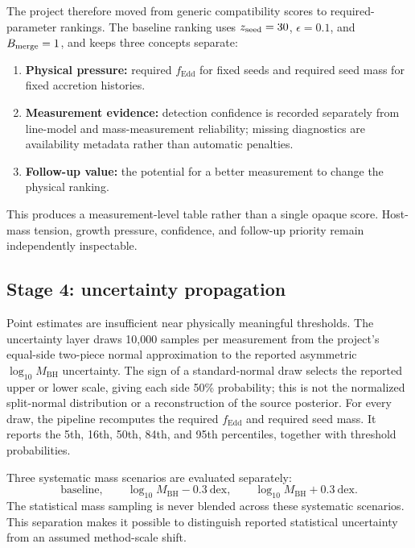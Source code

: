 \documentclass[11pt]{article}
\newcommand{\fedd}{f_{\mathrm{Edd}}}
\newcommand{\mbh}{M_{\mathrm{BH}}}
\begin{document}
The project therefore moved from generic compatibility scores to required-parameter rankings. The baseline ranking uses $z_{\rm seed}=30$, $\epsilon=0.1$, and $B_{\rm merge}=1$, and keeps three concepts separate:

\begin{enumerate}
  \item \textbf{Physical pressure:} required $\fedd$ for fixed seeds and required seed mass for fixed accretion histories.
  \item \textbf{Measurement evidence:} detection confidence is recorded separately from line-model and mass-measurement reliability; missing diagnostics are availability metadata rather than automatic penalties.
  \item \textbf{Follow-up value:} the potential for a better measurement to change the physical ranking.
\end{enumerate}

This produces a measurement-level table rather than a single opaque score. Host-mass tension, growth pressure, confidence, and follow-up priority remain independently inspectable.

\subsection{Stage 4: uncertainty propagation}

Point estimates are insufficient near physically meaningful thresholds. The uncertainty layer draws 10,000 samples per measurement from the project's equal-side two-piece normal approximation to the reported asymmetric $\log_{10}\mbh$ uncertainty. The sign of a standard-normal draw selects the reported upper or lower scale, giving each side 50\% probability; this is not the normalized split-normal distribution or a reconstruction of the source posterior. For every draw, the pipeline recomputes the required $\fedd$ and required seed mass. It reports the 5th, 16th, 50th, 84th, and 95th percentiles, together with threshold probabilities.

Three systematic mass scenarios are evaluated separately:
\begin{equation}
\mathrm{baseline},\qquad \log_{10}\mbh-0.3\ \mathrm{dex},\qquad
\log_{10}\mbh+0.3\ \mathrm{dex}.
\end{equation}
The statistical mass sampling is never blended across these systematic scenarios. This separation makes it possible to distinguish reported statistical uncertainty from an assumed method-scale shift.
\end{document}
